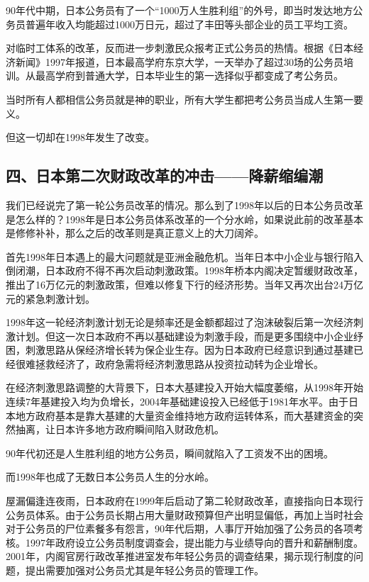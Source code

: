 90年代中期，日本公务员有了一个“1000万人生胜利组”的外号，即当时发达地方公务员普遍年收入均能超过1000万日元，超过了丰田等头部企业的员工平均工资。

对临时工体系的改革，反而进一步刺激民众报考正式公务员的热情。根据《日本经济新闻》1997年报道，日本最高学府东京大学，一天举办了超过30场的公务员培训。从最高学府到普通大学，日本毕业生的第一选择似乎都变成了考公务员。

当时所有人都相信公务员就是神的职业，所有大学生都把考公务员当成人生第一要义。

但这一切却在1998年发生了改变。

\subsection{四、日本第二次财政改革的冲击——降薪缩编潮}

我们已经说完了第一轮公务员改革的情况。那么到了1998年以后的日本公务员改革是怎么样的？1998年是日本公务员体系改革的一个分水岭，如果说此前的改革基本是修修补补，那么之后的改革则是真正意义上的大刀阔斧。

首先1998年日本遇上的最大问题就是亚洲金融危机。当年日本中小企业与银行陷入倒闭潮，日本政府不得不再次启动刺激政策。1998年桥本内阁决定暂缓财政改革，推出了16万亿元的刺激政策，但难以修复下行的经济形势。当年又再次出台24万亿元的紧急刺激计划。

1998年这一轮经济刺激计划无论是频率还是金额都超过了泡沫破裂后第一次经济刺激计划。但这一次日本政府不再以基础建设为刺激手段，而是更多围绕中小企业纾困，刺激思路从保经济增长转为保企业生存。因为日本政府已经意识到通过基建已经很难拯救经济了，政府急需将经济刺激思路从投资拉动转为企业增长。

在经济刺激思路调整的大背景下，日本大基建投入开始大幅度萎缩，从1998年开始连续7年基建投入均为负增长，2004年基础建设投入已经低于1981年水平。由于日本地方政府基本是靠大基建的大量资金维持地方政府运转体系，而大基建资金的突然抽离，让日本许多地方政府瞬间陷入财政危机。

90年代初还是人生胜利组的地方公务员，瞬间就陷入了工资发不出的困境。

而1998年也成了无数日本公务员人生的分水岭。

屋漏偏逢连夜雨，日本政府在1999年后启动了第二轮财政改革，直接指向日本现行公务员体系。由于公务员长期占用大量财政预算但产出明显偏低，再加上当时社会对于公务员的尸位素餐多有怨言，90年代后期，人事厅开始加强了公务员的各项考核。1997年政府设立公务员制度调查会，提出能力与业绩导向的晋升和薪酬制度。2001年，内阁官房行政改革推进室发布年轻公务员的调查结果，揭示现行制度的问题，提出需要加强对公务员尤其是年轻公务员的管理工作。

